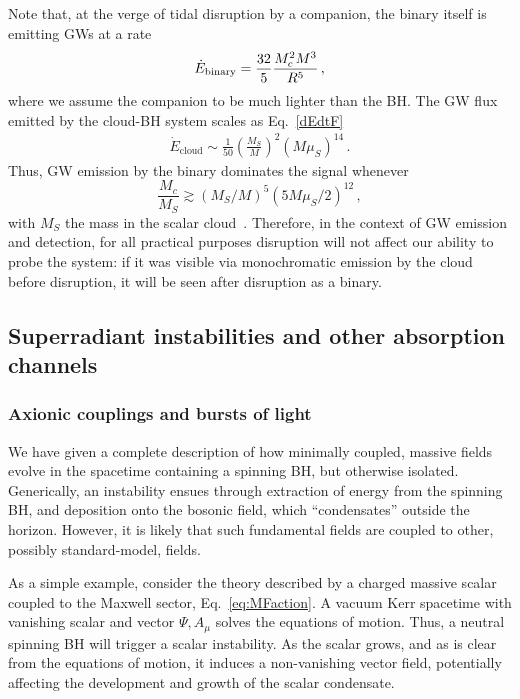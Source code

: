 \documentclass[11pt]{article}
\newcommand{\be}{\begin{equation}}
\newcommand{\ee}{\end{equation}}
\def\beq{\begin{eqnarray}}
\def\eeq{\end{eqnarray}}
\numberwithin{equation}{section} %
\begin{document}
Note that, at the verge of tidal disruption by a companion, the binary itself is emitting GWs at a rate
%
\be
\dot{E}_{\rm binary}= \frac{32}{5}\frac{M_c^2M^3}{R^5}\,,
\ee
%
where we assume the companion to be much lighter than the BH. The GW flux emitted by the cloud-BH system scales as Eq.~\eqref{dEdtF}~\cite{Yoshino:2013ofa,Brito:2014wla,Brito:2017zvb}
%
\beq
\dot{E}_{\text{cloud}}\sim \frac{1}{50}\left(\frac{M_S}{M}\right)^2\left(M\mu_S\right)^{14} \,.
\eeq
%
Thus, GW emission by the binary dominates the signal whenever
%
\be
\frac{M_c}{M_S}\gtrsim (M_S/M)^5(5M\mu_S/2)^{12}\,,
\ee
%
with $M_S$ the mass in the scalar cloud~\cite{Yoshino:2013ofa,Brito:2014wla,Brito:2017zvb}. Therefore, in the context of GW emission and detection, for all practical purposes disruption will not affect our ability to probe the system:
if it was visible via monochromatic emission by the cloud before disruption, it will be seen after disruption as a binary. 


\subsection{Superradiant instabilities and other absorption channels}\label{sec:super_couplings}
\subsubsection{Axionic couplings and bursts of light\label{sec:axion_coupling}}
We have given a complete description of how minimally coupled, massive fields evolve
in the spacetime containing a spinning BH, but otherwise isolated. Generically, an instability ensues through extraction
of energy from the spinning BH, and deposition onto the bosonic field, which ``condensates'' outside the horizon.
However, it is likely that such fundamental fields are coupled to other, possibly standard-model, fields.

As a simple example, consider the theory described by a charged massive scalar coupled to the Maxwell sector, 
Eq.~\eqref{eq:MFaction}.
A vacuum Kerr spacetime with vanishing scalar and vector $\Psi, A_\mu$ solves the equations of motion. Thus, a neutral 
spinning BH will trigger a scalar instability.
As the scalar grows, and as is clear from the equations of motion, it induces a non-vanishing vector field, potentially 
affecting the development and growth of the scalar condensate.
\end{document}
